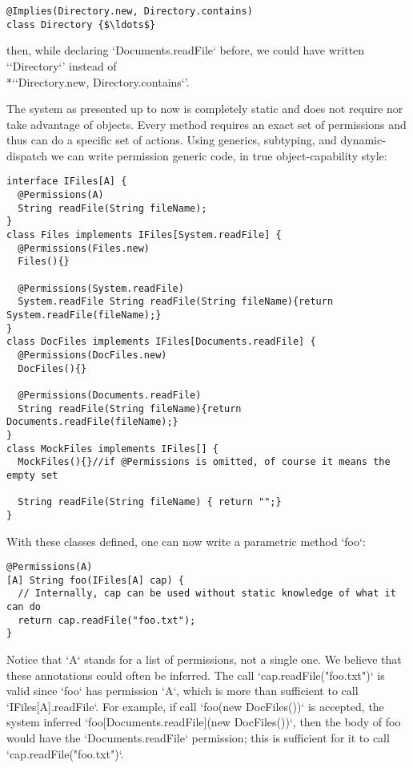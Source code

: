 \documentclass[a4paper,twoside,british,9pt]{extarticle}
\providecommand*{\code}[1]{\Q`#1`}
\begin{document}
\begin{lstlisting}
@Implies(Directory.new, Directory.contains)
class Directory {$\ldots$}
\end{lstlisting}

then, while declaring \code{Documents.readFile} before, we could
have written `\code{Directory}' instead of \\*`\code{Directory.new, Directory.contains}'.

The system as presented up to now is completely static and does not
require nor take advantage of objects. Every method requires an exact
set of permissions and thus can do a specific set of actions. Using
generics, subtyping, and dynamic-dispatch we can write permission generic code,
in true object-capability style:

\begin{lstlisting}
interface IFiles[A] {
  @Permissions(A)
  String readFile(String fileName);
}
class Files implements IFiles[System.readFile] {
  @Permissions(Files.new)
  Files(){}
  
  @Permissions(System.readFile)
  System.readFile String readFile(String fileName){return System.readFile(fileName);}
}
class DocFiles implements IFiles[Documents.readFile] {
  @Permissions(DocFiles.new)
  DocFiles(){}
  
  @Permissions(Documents.readFile)
  String readFile(String fileName){return Documents.readFile(fileName);}
}
class MockFiles implements IFiles[] {
  MockFiles(){}//if @Permissions is omitted, of course it means the empty set 
  
  String readFile(String fileName) { return "";}
}
\end{lstlisting}

 With these classes defined, one can now
write a parametric method \code{foo}:

\begin{lstlisting}
@Permissions(A)
[A] String foo(IFiles[A] cap) {
  // Internally, cap can be used without static knowledge of what it can do
  return cap.readFile("foo.txt");
}
\end{lstlisting}

Notice that \code{A} stands for a list of permissions, not a single
one. 
We believe that these annotations could often be inferred. The call \code{cap.readFile("foo.txt")}
is valid since \code{foo} has permission \code{A}, which is more
than sufficient to call \code{IFiles[A].readFile}.
For example, if call \code{foo(new DocFiles())}
is accepted, the system inferred \code{foo[Documents.readFile](new DocFiles())}, 
then the body of foo would have the \code{Documents.readFile} permission; this is sufficient for it to call
\code{cap.readFile("foo.txt")}.
\end{document}
